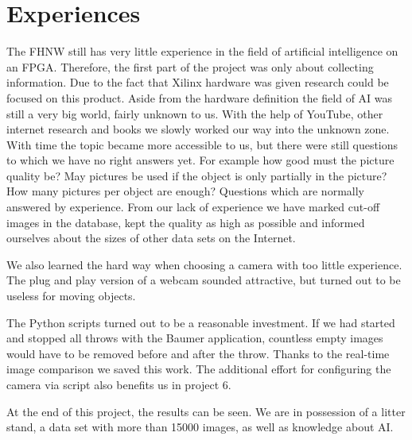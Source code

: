 \section{Experiences}
\label{sec:experiences}

The FHNW still has very little experience in the field of artificial intelligence on an FPGA.
Therefore, the first part of the project was only about collecting information.
Due to the fact that Xilinx hardware was given research could be focused on this product.
Aside from the hardware definition the field of AI was still a very big world, fairly unknown to us.
With the help of YouTube, other internet research and books we slowly worked our way into the unknown zone. 
With time the topic became more accessible to us, but there were still questions to which we have no right answers yet.
For example how good must the picture quality be? 
May pictures be used if the object is only partially in the picture?
How many pictures per object are enough?
Questions which are normally answered by experience.
From our lack of experience we have marked cut-off images in the database, kept the quality as high as possible and informed ourselves about the sizes of other data sets on the Internet.

We also learned the hard way when choosing a camera with too little experience.
The plug and play version of a webcam sounded attractive, but turned out to be useless for moving objects.

The Python scripts turned out to be a reasonable investment.
If we had started and stopped all throws with the Baumer application, countless empty images would have to be removed before and after the throw.
Thanks to the real-time image comparison we saved this work.
The additional effort for configuring the camera via script also benefits us in project 6.

At the end of this project, the results can be seen.
We are in possession of a litter stand, a data set with more than \num{15000} images, as well as knowledge about AI.
